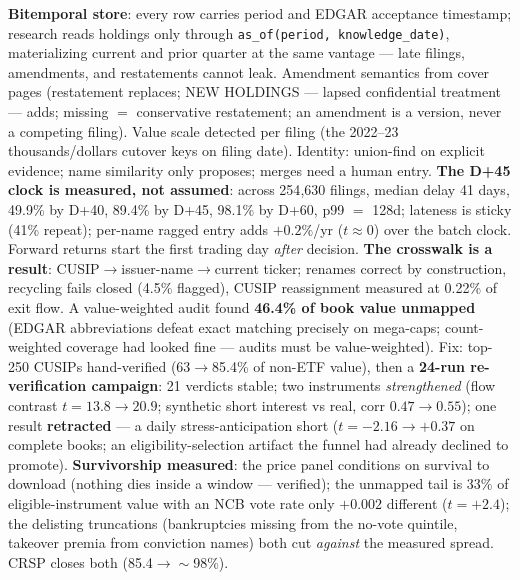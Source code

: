 \documentclass[10pt]{article}
\begin{document}
\textbf{Bitemporal store}: every row carries period and EDGAR
acceptance timestamp; research reads holdings only through
\texttt{as\_of(period, knowledge\_date)}, materializing current and
prior quarter at the same vantage --- late filings, amendments, and
restatements cannot leak. Amendment semantics from cover pages
(restatement replaces; NEW HOLDINGS --- lapsed confidential
treatment --- adds; missing $=$ conservative restatement; an
amendment is a version, never a competing filing). Value scale
detected per filing (the 2022--23 thousands/dollars cutover keys on
filing date). Identity: union-find on explicit evidence; name
similarity only proposes; merges need a human entry. \textbf{The
D+45 clock is measured, not assumed}: across 254{,}630 filings,
median delay 41 days, 49.9\% by D+40, 89.4\% by D+45, 98.1\% by
D+60, p99 $=$ 128d; lateness is sticky (41\% repeat); per-name
ragged entry adds $+0.2\%$/yr ($t\approx0$) over the batch clock.
Forward returns start the first trading day \emph{after} decision.
\textbf{The crosswalk is a result}:
CUSIP$\to$issuer-name$\to$current ticker; renames correct by
construction, recycling fails closed (4.5\% flagged), CUSIP
reassignment measured at 0.22\% of exit flow. A value-weighted audit
found \textbf{46.4\% of book value unmapped} (EDGAR abbreviations
defeat exact matching precisely on mega-caps; count-weighted
coverage had looked fine --- audits must be value-weighted). Fix:
top-250 CUSIPs hand-verified (63$\to$85.4\% of non-ETF value), then
a \textbf{24-run re-verification campaign}: 21 verdicts stable; two
instruments \emph{strengthened} (flow contrast $t=13.8\to20.9$;
synthetic short interest vs real, corr $0.47\to0.55$); one result
\textbf{retracted} --- a daily stress-anticipation short
($t=-2.16\to+0.37$ on complete books; an eligibility-selection
artifact the funnel had already declined to promote).
\textbf{Survivorship measured}: the price panel conditions on
survival to download (nothing dies inside a window --- verified);
the unmapped tail is 33\% of eligible-instrument value with an NCB
vote rate only $+0.002$ different ($t=+2.4$); the delisting
truncations (bankruptcies missing from the no-vote quintile,
takeover premia from conviction names) both cut \emph{against} the
measured spread. CRSP closes both (85.4$\to\sim$98\%).
\end{document}
